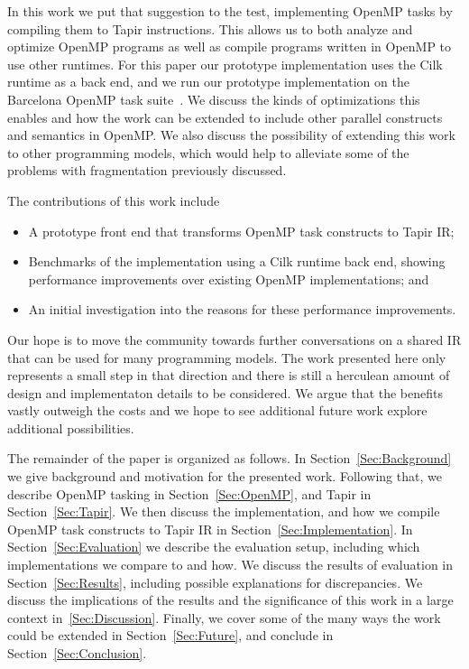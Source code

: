 \documentclass[sigconf]{acmart}
\begin{document}
In this work we put that suggestion to the test, implementing OpenMP tasks by
compiling them to Tapir instructions. This allows us to both analyze and optimize
OpenMP programs as well as compile programs written in OpenMP to use other runtimes.
For this paper our prototype implementation uses the Cilk runtime as a back end,
and we run our prototype implementation on the Barcelona OpenMP task suite~\cite{barcelona}. 
We discuss the kinds of optimizations this enables and how
the work can be extended to include other parallel constructs and semantics
in OpenMP. We also discuss the possibility of extending this work to other
programming models, which would help to alleviate some of the problems with fragmentation
previously discussed.

The contributions of this work include
\begin{itemize}
  \item A prototype front end that transforms OpenMP task constructs to Tapir IR;
  \item Benchmarks of the implementation using a Cilk runtime back end, showing
        performance improvements over existing OpenMP implementations; and
  \item An initial investigation into the reasons for these performance improvements.
\end{itemize}
Our hope is to move the community towards further conversations on a 
shared IR that can be used for many programming models. The work presented here only
represents a small step in that direction and there is still a herculean amount
of design and implementaton details to be considered. We argue that the benefits vastly outweigh 
the costs and we hope to see additional future work explore additional possibilities. 


The remainder of the paper is organized as follows.  In Section~\ref{Sec:Background} 
we give background and motivation for the presented work. Following that, we describe OpenMP
tasking in Section~\ref{Sec:OpenMP}, and Tapir in Section~\ref{Sec:Tapir}. We then 
discuss the implementation, and how we compile OpenMP task constructs to Tapir IR in
Section~\ref{Sec:Implementation}. In Section~\ref{Sec:Evaluation} we describe the 
evaluation setup, including which implementations we compare to and how. We discuss
the results of evaluation in Section~\ref{Sec:Results}, including possible
explanations for discrepancies. We discuss the implications of the results and the
significance of this work in a large context in~\ref{Sec:Discussion}. Finally,
we cover some of the many ways the work could be extended in
Section~\ref{Sec:Future}, and conclude in Section~\ref{Sec:Conclusion}.
\end{document}
